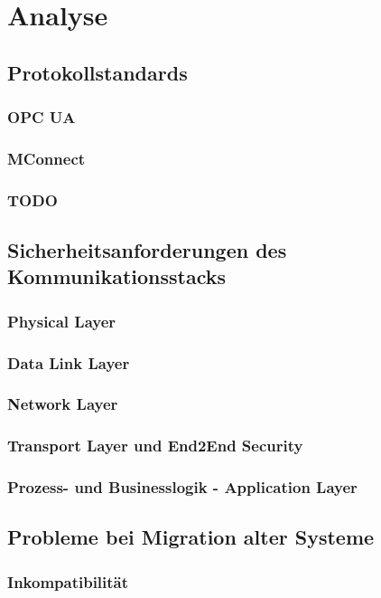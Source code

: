 \chapter{Analyse}

\section{Protokollstandards}
\subsection{OPC UA}
\subsection{MConnect}
\subsection{TODO}

\section{Sicherheitsanforderungen des Kommunikationsstacks}
\subsection{Physical Layer}
\subsection{Data Link Layer}
\subsection{Network Layer}
\subsection{Transport Layer und End2End Security}
\subsection{Prozess- und Businesslogik - Application Layer}

\section{Probleme bei Migration alter Systeme}
\subsection{Inkompatibilität}
